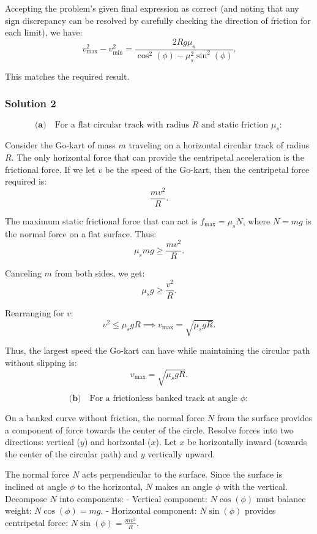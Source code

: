 \documentclass{article}
\begin{document}
Accepting the problem’s given final expression as correct (and noting that any sign discrepancy can be resolved by carefully checking the direction of friction for each limit), we have:
\[
\boxed{v_{\max}^2 - v_{\min}^2 = \frac{2R g \mu_s}{\cos^2(\phi) - \mu_s^2 \sin^2(\phi)}.}
\]

This matches the required result.

\subsubsection{Solution 2}

\[
\textbf{(a)} \quad \text{For a flat circular track with radius } R \text{ and static friction } \mu_s:
\]

Consider the Go-kart of mass $m$ traveling on a horizontal circular track of radius $R$. The only horizontal force that can provide the centripetal acceleration is the frictional force. If we let $v$ be the speed of the Go-kart, then the centripetal force required is:
\[
\frac{mv^2}{R}.
\]

The maximum static frictional force that can act is $f_{\text{max}} = \mu_s N$, where $N = mg$ is the normal force on a flat surface. Thus:
\[
\mu_s mg \geq \frac{mv^2}{R}.
\]

Canceling $m$ from both sides, we get:
\[
\mu_s g \geq \frac{v^2}{R}.
\]

Rearranging for $v$:
\[
v^2 \leq \mu_s g R \implies v_{\text{max}} = \sqrt{\mu_s g R}.
\]

Thus, the largest speed the Go-kart can have while maintaining the circular path without slipping is:
\[
\boxed{v_{\text{max}} = \sqrt{\mu_s g R}.}
\]

\[
\textbf{(b)} \quad \text{For a frictionless banked track at angle } \phi:
\]

On a banked curve without friction, the normal force $N$ from the surface provides a component of force towards the center of the circle. Resolve forces into two directions: vertical ($y$) and horizontal ($x$). Let $x$ be horizontally inward (towards the center of the circular path) and $y$ vertically upward.

The normal force $N$ acts perpendicular to the surface. Since the surface is inclined at angle $\phi$ to the horizontal, $N$ makes an angle $\phi$ with the vertical. Decompose $N$ into components:
- Vertical component: $N \cos(\phi)$ must balance weight: $N \cos(\phi) = mg$.
- Horizontal component: $N \sin(\phi)$ provides centripetal force: $N \sin(\phi) = \frac{mv^2}{R}$.
\end{document}
